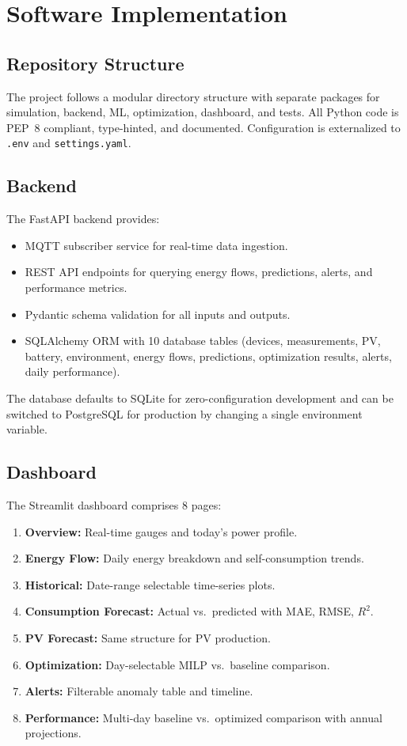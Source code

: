 \chapter{Software Implementation}
\label{ch:implementation}

\section{Repository Structure}

The project follows a modular directory structure with separate packages for simulation, backend, ML, optimization, dashboard, and tests. All Python code is PEP~8 compliant, type-hinted, and documented. Configuration is externalized to \texttt{.env} and \texttt{settings.yaml}.

\section{Backend}

The FastAPI backend provides:
\begin{itemize}[nosep]
    \item MQTT subscriber service for real-time data ingestion.
    \item REST API endpoints for querying energy flows, predictions, alerts, and performance metrics.
    \item Pydantic schema validation for all inputs and outputs.
    \item SQLAlchemy ORM with 10 database tables (devices, measurements, PV, battery, environment, energy flows, predictions, optimization results, alerts, daily performance).
\end{itemize}

The database defaults to SQLite for zero-configuration development and can be switched to PostgreSQL for production by changing a single environment variable.

\section{Dashboard}

The Streamlit dashboard comprises 8 pages:
\begin{enumerate}[nosep]
    \item \textbf{Overview:} Real-time gauges and today's power profile.
    \item \textbf{Energy Flow:} Daily energy breakdown and self-consumption trends.
    \item \textbf{Historical:} Date-range selectable time-series plots.
    \item \textbf{Consumption Forecast:} Actual vs.\ predicted with MAE, RMSE, $R^2$.
    \item \textbf{PV Forecast:} Same structure for PV production.
    \item \textbf{Optimization:} Day-selectable MILP vs.\ baseline comparison.
    \item \textbf{Alerts:} Filterable anomaly table and timeline.
    \item \textbf{Performance:} Multi-day baseline vs.\ optimized comparison with annual projections.
\end{enumerate}

